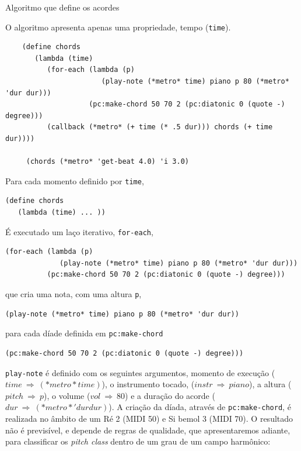 \begin{example}{Algoritmo que define os acordes}

O algoritmo apresenta apenas uma propriedade, tempo (\verb|time|).

\begin{verbatim}
    (define chords
       (lambda (time)
          (for-each (lambda (p)
                       (play-note (*metro* time) piano p 80 (*metro* 'dur dur)))                                 
                    (pc:make-chord 50 70 2 (pc:diatonic 0 (quote -) degree)))
          (callback (*metro* (+ time (* .5 dur))) chords (+ time dur))))
    
     (chords (*metro* 'get-beat 4.0) 'i 3.0)
\end{verbatim}

Para cada momento definido por \verb|time|,

\begin{verbatim}
(define chords
   (lambda (time) ... ))
\end{verbatim}

É executado um laço iterativo, \verb|for-each|, 

\begin{verbatim}
(for-each (lambda (p)
             (play-note (*metro* time) piano p 80 (*metro* 'dur dur)))                                 
          (pc:make-chord 50 70 2 (pc:diatonic 0 (quote -) degree)))
\end{verbatim}

que cria uma nota, com uma altura \verb|p|, 

\begin{verbatim}
(play-note (*metro* time) piano p 80 (*metro* 'dur dur))
\end{verbatim}

para cada díade definida em \verb|pc:make-chord|

\begin{verbatim}
(pc:make-chord 50 70 2 (pc:diatonic 0 (quote -) degree)))
\end{verbatim}

\verb|play-note| é definido com os seguintes argumentos, momento de execução ($time~\Rightarrow~(*metro* time)$), o instrumento tocado, ($instr~\Rightarrow~piano$), a altura ($pitch~\Rightarrow~p$), o volume ($vol~\Rightarrow~80$) e a duração do acorde ($dur~\Rightarrow~(*metro* 'dur dur)$). A criação da díada, através de \verb|pc:make-chord|, é realizada no âmbito de um Ré 2 (MIDI 50) e Si bemol 3 (MIDI 70). O resultado não é previsível, e depende de regras de qualidade, que apresentaremos adiante, para classificar os \emph{pitch class} dentro de um grau de um campo harmônico:


\end{example}
